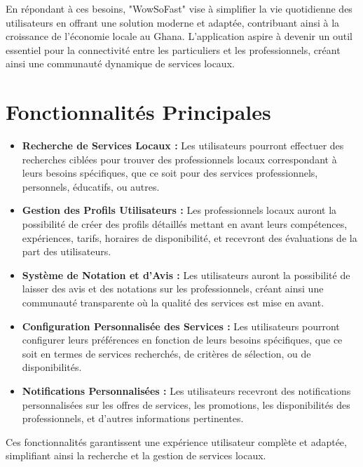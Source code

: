 En répondant à ces besoins, "WowSoFast" vise à simplifier la vie quotidienne des utilisateurs en offrant une solution moderne et adaptée, contribuant ainsi à la croissance de l'économie locale au Ghana. L'application aspire à devenir un outil essentiel pour la connectivité entre les particuliers et les professionnels, créant ainsi une communauté dynamique de services locaux.

\section{Fonctionnalités Principales}

\begin{itemize}
    \item \textbf{Recherche de Services Locaux :} Les utilisateurs pourront effectuer des recherches ciblées pour trouver des professionnels locaux correspondant à leurs besoins spécifiques, que ce soit pour des services professionnels, personnels, éducatifs, ou autres.

    \item \textbf{Gestion des Profils Utilisateurs :} Les professionnels locaux auront la possibilité de créer des profils détaillés mettant en avant leurs compétences, expériences, tarifs, horaires de disponibilité, et recevront des évaluations de la part des utilisateurs.

    \item \textbf{Système de Notation et d'Avis :} Les utilisateurs auront la possibilité de laisser des avis et des notations sur les professionnels, créant ainsi une communauté transparente où la qualité des services est mise en avant.

    \item \textbf{Configuration Personnalisée des Services :} Les utilisateurs pourront configurer leurs préférences en fonction de leurs besoins spécifiques, que ce soit en termes de services recherchés, de critères de sélection, ou de disponibilités.

    \item \textbf{Notifications Personnalisées :} Les utilisateurs recevront des notifications personnalisées sur les offres de services, les promotions, les disponibilités des professionnels, et d'autres informations pertinentes.

\end{itemize}

Ces fonctionnalités garantissent une expérience utilisateur complète et adaptée, simplifiant ainsi la recherche et la gestion de services locaux.

